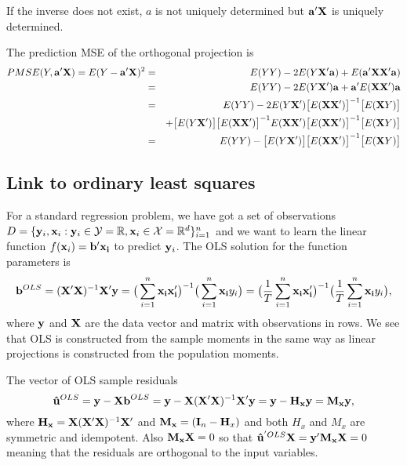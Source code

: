 If the inverse does not exist, $a$ is not uniquely determined but $\mathbf{a}'\mathbf{X}$ is uniquely determined.

The prediction MSE of the orthogonal projection is
\begin{eqnarray}
PMSE(Y,\mathbf{a'X}) = 
E(Y - \mathbf{a'X})^2 & = & E(YY) - 2E(Y\mathbf{X'a}) + E(\mathbf{a'XX'a}) \nonumber \\
& = & E(YY) - 2E(Y\mathbf{X'}) \mathbf{a} + \mathbf{a'} E(\mathbf{XX'}) \mathbf{a} \nonumber \\
& = &  E(YY) - 2E(Y\mathbf{X'}) \big[ E(\mathbf{XX'}) \big]^{-1} \big[ E(\mathbf{X}Y) \big] \nonumber \\
& & + \big[ E(Y\mathbf{X'}) \big] \big[ E(\mathbf{XX'}) \big]^{-1} E(\mathbf{XX'}) \big[ E(\mathbf{XX'}) \big]^{-1} \big[ E(\mathbf{X}Y) \big] \nonumber \\
& = & E(YY) - \big[ E(Y\mathbf{X'}) \big] \big[ E(\mathbf{XX'}) \big]^{-1} \big[ E(\mathbf{X}Y) \big]
\end{eqnarray}

\subsection{Link to ordinary least squares}\label{sec:LinkOLS}
For a standard regression problem, we have got a set of observations $D = \{ \mathbf{y}_i,\mathbf{x}_i: \mathbf{y}_i \in \mathcal{Y} = \mathbb{R}, \mathbf{x}_i \in \mathcal{X}=\mathbb{R}^d \}_{i=1}^n$ and we want to learn the linear function $f(\mathbf{x}_i) = \mathbf{b' x_i}$ to predict $\mathbf{y}_i$.
The OLS solution for the function parameters is
\begin{equation}
\mathbf{b}^{OLS} = (\mathbf{X'X})^{-1}\mathbf{X'y} = 
\big( \sum_{i=1}^n \mathbf{x_i x_i'} \big)^{-1} \big( \sum_{i=1}^n \mathbf{x_i} y_i \big) =
\big( \frac{1}{T}\sum_{i=1}^n \mathbf{x_i x_i'} \big)^{-1} \big( \frac{1}{T}\sum_{i=1}^n \mathbf{x_i} y_i \big),
\end{equation}
where $\mathbf{y}$ and $\mathbf{X}$ are the data vector and matrix with observations in rows.
We see that OLS is constructed from the sample moments in the same way as linear projections is constructed from the population moments.

The vector of OLS sample residuals
\begin{equation}
\mathbf{\hat{u}}^{OLS} = \mathbf{y} - \mathbf{X b}^{OLS} = \mathbf{y} - \mathbf{X}(\mathbf{X'X})^{-1}\mathbf{X'y} = \mathbf{y} - \mathbf{H_x y} = \mathbf{M_x y},
\end{equation}
where $\mathbf{H_x} = \mathbf{X}(\mathbf{X'X})^{-1}\mathbf{X'}$ and $\mathbf{M_x} = (\mathbf{I}_n - \mathbf{H}_x)$ and both $H_x$ and $M_x$ are symmetric and idempotent.
Also $\mathbf{M_x X} = 0$ so that $\mathbf{\hat{u}}^{'OLS} \mathbf{X} = \mathbf{y' M_x X} = 0$ meaning that the residuals are orthogonal to the input variables.

